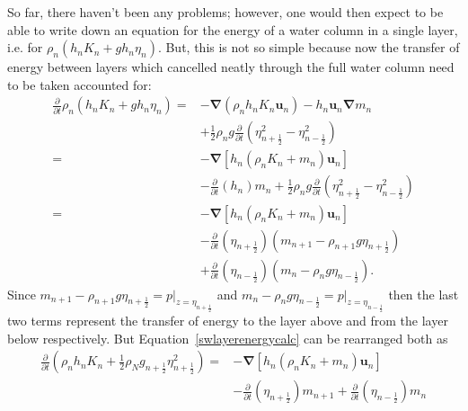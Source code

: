\documentclass[12pt,a4paper]{report}
\newcommand*\equref[1]{Equation~\eqref{#1}}
\newcommand*{\half}{\frac{1}{2}}
\begin{document}
    So far, there haven't been any problems; however, one would then expect to be able to write down
    an equation for the energy of a water column in a single layer, i.e. for 
    $\rho_{n}\left(h_{n} K_{n}+ g h_{n}\eta_{n}\right)$. But, this is not
    so simple because now the transfer of energy between layers which cancelled neatly
    through the full water column need to be taken accounted for:
    \begin{equation}
    \label{swlayerenergycalc}
    \begin{split}
    \frac{\partial}{\partial t}\rho_{n}\left(h_{n} K_{n}+ g h_{n}\eta_{n}\right) 
    =& - \boldsymbol{\nabla} \left(\rho_{n} h_{n} K_{n} \boldsymbol{u}_{n}\right) 
    - h_{n} \boldsymbol{u}_{n}  \boldsymbol{\nabla} m_{n} \\
    &+\half  \rho_{n} g \frac{\partial}{\partial t}\left(\eta_{n+\half }^{2} -\eta_{n-\half }^{2}\right) \\
    =& - \boldsymbol{\nabla} \left[h_{n}  \left(\rho_{n}K_{n}+ m_{n}\right) \boldsymbol{u}_{n}\right] \\
    &- \frac{\partial}{\partial t}\left(h_{n}\right)   m_{n}
    +\half  \rho_{n} g \frac{\partial}{\partial t}\left(\eta_{n+\half }^{2} -\eta_{n-\half }^{2}\right) \\
    =& -\boldsymbol{\nabla} \left[h_{n} \left(\rho_{n}K_{n}+m_{n}\right) \boldsymbol{u}_{n}\right] \\
    &- \frac{\partial}{\partial t}\left(\eta_{n+\half }\right)\left(   m_{n+1} - \rho_{n+1}g \eta_{n+\half }\right) \\
    &+ \frac{\partial}{\partial t}\left(\eta_{n-\half }\right)\left(   m_{n}- \rho_{n}g \eta_{n-\half }\right).
    \end{split}
    \end{equation}
    Since $m_{n+1} - \rho_{n+1}g \eta_{n+\half }=p\rvert_{z=\eta_{n+\half }}$ and
    $m_{n} - \rho_{n}g \eta_{n-\half }=p\rvert_{z=\eta_{n-\half }}$ then the last
    two terms represent the transfer of energy to the layer above and from the layer below
    respectively. But \equref{swlayerenergycalc}
    can be rearranged both as
    \begin{equation}
    \begin{split}
    \frac{\partial}{\partial t}\left(\rho_{n} h_{n} K_{n}+ 
    \half \rho_{N} g_{n+\half }\eta_{n+\half }^{2} \right) 
    =& -\boldsymbol{\nabla} \left[h_{n} \left(\rho_{n}K_{n}+m_{n}\right) \boldsymbol{u}_{n}\right]\\ 
    &- \frac{\partial}{\partial t}\left(\eta_{n+\half }\right)   m_{n+1}
    + \frac{\partial}{\partial t}\left(\eta_{n-\half }\right) m_{n}
    \end{split}
    \label{swlayercorrectenergy}
    \end{equation}
\end{document}
